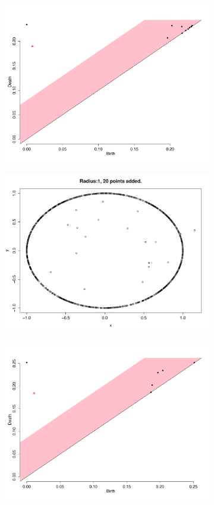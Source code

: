 \documentclass[a4paper]{article}
\begin{document}
\begin{figure}[htp!]
\begin{subfigure}{.20\textwidth}
  \includegraphics[width=\linewidth]{testtest3}
\end{subfigure}%
\begin{subfigure}{.20\textwidth}
  \centering
  \includegraphics[width=\linewidth]{testtest4}
\end{subfigure}%
\begin{subfigure}{.20\textwidth}
  \centering
  \includegraphics[width=\linewidth]{testtest5}

\end{subfigure}
\end{figure}
\end{document}
